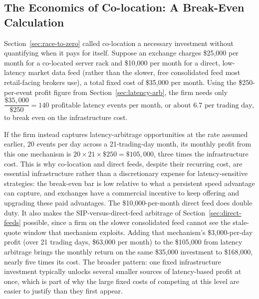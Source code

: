 \documentclass[../ai_in_finance]{subfiles}
\begin{document}
\subsection{The Economics of Co-location: A Break-Even Calculation}

Section~\ref{sec:race-to-zero} called co-location a necessary investment without quantifying when it pays for itself. Suppose an exchange charges \$25,000 per month for a co-located server rack and \$10,000 per month for a direct, low-latency market data feed (rather than the slower, free consolidated feed most retail-facing brokers use), a total fixed cost of \$35,000 per month. Using the \$250-per-event profit figure from Section~\ref{sec:latency-arb}, the firm needs only
\begin{equation*}
\frac{\$35{,}000}{\$250} = 140 \text{ profitable latency events per month, or about } 6.7 \text{ per trading day},
\end{equation*}
to break even on the infrastructure cost.

If the firm instead captures latency-arbitrage opportunities at the rate assumed earlier, 20 events per day across a 21-trading-day month, its monthly profit from this one mechanism is $20 \times 21 \times \$250 = \$105{,}000$, three times the infrastructure cost. This is why co-location and direct feeds, despite their recurring cost, are essential infrastructure rather than a discretionary expense for latency-sensitive strategies: the break-even bar is low relative to what a persistent speed advantage can capture, and exchanges have a commercial incentive to keep offering and upgrading these paid advantages. The \$10,000-per-month direct feed does double duty. It also makes the SIP-versus-direct-feed arbitrage of Section~\ref{sec:direct-feeds} possible, since a firm on the slower consolidated feed cannot see the stale-quote window that mechanism exploits. Adding that mechanism's \$3,000-per-day profit (over 21 trading days, \$63,000 per month) to the \$105,000 from latency arbitrage brings the monthly return on the same \$35,000 investment to \$168,000, nearly five times its cost. The broader pattern: one fixed infrastructure investment typically unlocks several smaller sources of latency-based profit at once, which is part of why the large fixed costs of competing at this level are easier to justify than they first appear.

\end{document}

